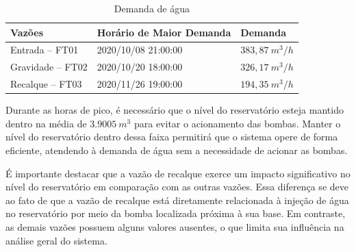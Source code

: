 \begin{table}[!htb]
	\centering
	\caption{Demanda de água}\label{tb:dem}
	\begin{tabular}{@{}lll@{}}
		\toprule
		\textbf{Vazões}         & \textbf{Horário de Maior Demanda} & \textbf{Demanda} \\ \midrule
		Entrada -- FT01   & 2020/10/08 21:00:00               & $383,87 \ m^3/h$                   \\
		Gravidade -- FT02 & 2020/10/20 18:00:00               & $326,17 \ m^3/h$                    \\
		Recalque -- FT03  & 2020/11/26 19:00:00               & $194,35 \ m^3/h$                    \\ \bottomrule
	\end{tabular}
	
	
\end{table}

Durante as horas de pico, é necessário que o nível do reservatório esteja mantido dentro na média de $3.9005 \ m^3$ para evitar o acionamento das bombas. Manter o nível do reservatório dentro dessa faixa permitirá que o sistema opere de forma eficiente, atendendo à demanda de água sem a necessidade de acionar as bombas.

É importante destacar que a vazão de recalque exerce um impacto significativo no nível do reservatório em comparação com as outras vazões. Essa diferença se deve ao fato de que a vazão de recalque está diretamente relacionada à injeção de água no reservatório por meio da bomba localizada próxima à sua base. Em contraste, as demais vazões possuem alguns valores ausentes, o que limita sua influência na análise geral do sistema.







